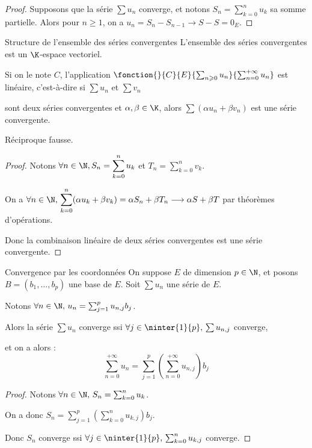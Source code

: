 \begin{proof}
    Supposons que la série $\sum u_n$ converge, et notons $\displaystyle S_n = \sum_{k=0}^n u_k$ sa somme partielle.
    Alors pour $n \geqslant 1$, on a $u_n = S_n - S_{n-1} \longrightarrow S - S = 0_E$.
\end{proof}

\begin{proposition}{Structure de l'ensemble des séries convergentes}{}
    L'ensemble des séries convergentes est un $\K$-espace vectoriel.

    Si on le note $C$, l'application $\fonction{}{C}{E}{\sum_{n \geqslant 0} u_n}{\sum_{n = 0}^{+\infty} u_n}$ 
    est linéaire, c'est-à-dire si $\sum u_n$ et $\sum v_n$
    
    \svspace sont deux séries convergentes et $\alpha, \beta \in \K$, alors $\sum (\alpha u_n + \beta v_n)$ est une série convergente.
\end{proposition}

\begin{remarque}
    Réciproque fausse.
\end{remarque}

\begin{proof}
    Notons $\forall n \in \N, S_n = \displaystyle \sum_{k=0}^n u_k$ et $T_n = \displaystyle \sum_{k=0}^n v_k$.

    On a $\displaystyle \forall n \in \N, \, \sum_{k=0}^n (\alpha u_k + \beta v_k) = \alpha S_n + \beta T_n \longrightarrow \alpha S + \beta T$
    par théorèmes d'opérations. 

    Donc la combinaison linéaire de deux séries convergentes est une série convergente.
\end{proof}

\begin{proposition}{Convergence par les coordonnées}{}
    On suppose $E$ de dimension $p \in \N$, et posons $B = (b_1, \ldots, b_p)$ une base de $E$.
    Soit $\sum u_n$ une série de $E$. 

    Notons $\forall n \in \N, \, u_n = \sum_{j = 1 }^p u_{n,j} b_j$. 

    Alors la série $\sum u_n$ converge ssi $\forall j \in \ninter{1}{p}, \, \sum u_{n,j}$ converge, 

    et on a alors :
    \[\sum_{n = 0}^{+\infty} u_n = \sum_{j = 1}^p \left( \sum_{n = 0}^{+\infty} u_{n,j} \right) b_j\]
\end{proposition}

\begin{proof}
    Notons $\forall n \in \N, \, S_n = \sum_{k=0}^n u_k$. 

    On a donc $\displaystyle S_n = \sum_{j=1}^p \left( \sum_{k = 0}^{n} u_{k, j} \right) b_j$. 

    Donc $S_n$ converge ssi $\forall j \in \ninter{1}{p}, \, \sum_{k=0}^n u_{k, j}$ converge.
\end{proof}

